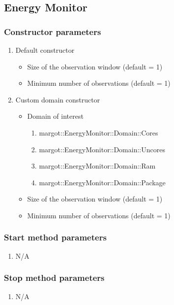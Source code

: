 \subsection{Energy Monitor}

\subsubsection*{Constructor parameters}
\begin{enumerate}
	\item Default constructor
		\begin{itemize}
			\item Size of the observation window (default = 1)
			\item Minimum number of observations (default = 1)
		\end{itemize}
	\item Custom domain constructor
		\begin{itemize}
			\item Domain of interest
				\begin{enumerate}
					\item margot::EnergyMonitor::Domain::Cores
					\item margot::EnergyMonitor::Domain::Uncores
					\item margot::EnergyMonitor::Domain::Ram
					\item margot::EnergyMonitor::Domain::Package
				\end{enumerate}
			\item Size of the observation window (default = 1)
			\item Minimum number of observations (default = 1)
		\end{itemize}
\end{enumerate}

\subsubsection*{Start method parameters}
\begin{enumerate}
	\item[] N/A
\end{enumerate}


\subsubsection*{Stop method parameters}
\begin{enumerate}
	\item[] N/A
\end{enumerate}





